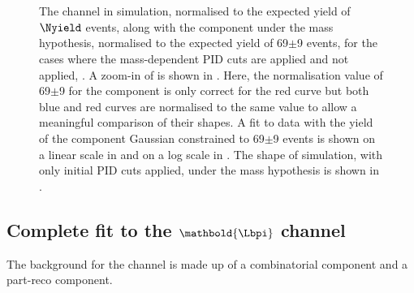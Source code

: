  
\begin{figure}[!h]
  \centering
  \vspace*{-2cm}
    \hspace*{-1.2cm}
    \\
    \hspace*{-1.2cm}
        \\
            \hspace*{-1.2cm}
  \caption{The \Lbpijpsi channel in simulation, normalised to the expected yield of $\Nyield$ events, along with the \BdToJPsiKst component under the \Lbpijpsi mass hypothesis, normalised to the expected yield of 69$\pm$9 events, for the cases where the mass-dependent PID cuts are applied and not applied, \protect{}. A zoom-in of \protect{} is shown in \protect{}. Here, the normalisation value of 69$\pm$9 for the \BdToJPsiKst component is only correct for the red curve but both blue and red curves are normalised to the same value to allow a meaningful comparison of their shapes. A fit to \Lbpijpsi data with the yield of the \BdToJPsiKst component Gaussian constrained to 69$\pm$9 events is shown on a linear scale in \protect{} and on a log scale in \protect{}. The shape of \BdToJPsiKst simulation, with only initial PID cuts applied, under the \Lbpijpsi mass hypothesis is shown in \protect{}.}
  \label{Fig:jpsibd}
\end{figure}
\FloatBarrier

\subsection[Complete fit to the $\Lbpi$ channel]{Complete fit to the $\mathbold{\Lbpi}$ channel}
\label{sec:fitppi}

The background for the \Lbpi channel is made up of a combinatorial component and a part-reco component. %


